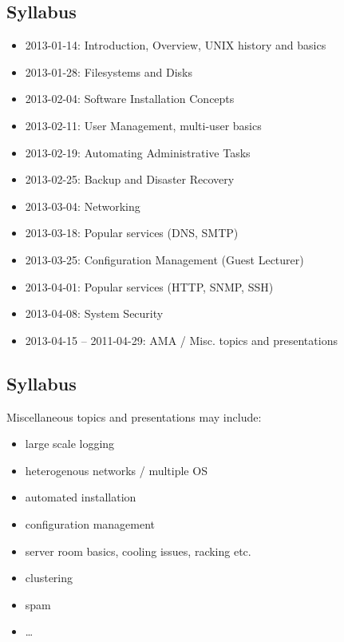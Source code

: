 \documentclass[xga]{xdvislides}
\begin{document}
\subsection{Syllabus}
\begin{itemize}
	\item 2013-01-14: Introduction, Overview, UNIX history and basics
	\item 2013-01-28: Filesystems and Disks
	\item 2013-02-04: Software Installation Concepts
	\item 2013-02-11: User Management, multi-user basics
	\item 2013-02-19: Automating Administrative Tasks
	\item 2013-02-25: Backup and Disaster Recovery
	\item 2013-03-04: Networking
	\item 2013-03-18: Popular services (DNS, SMTP)
	\item 2013-03-25: Configuration Management (Guest Lecturer)
	\item 2013-04-01: Popular services (HTTP, SNMP, SSH)
	\item 2013-04-08: System Security
	\item 2013-04-15 -- 2011-04-29: AMA / Misc. topics and presentations
\end{itemize}

\subsection{Syllabus}
Miscellaneous topics and presentations may include:
\begin{itemize}
	\item large scale logging
	\item heterogenous networks / multiple OS
	\item automated installation
	\item configuration management
	\item server room basics, cooling issues, racking etc.
	\item clustering
	\item spam
	\item \ldots
\end{itemize}
\end{document}
